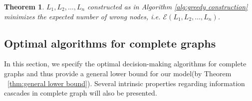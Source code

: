 \documentclass[a4paper,UKenglish]{lipics}
\newtheorem{thm}{Theorem}[section] %
\theoremstyle{definition}
\begin{document}
\begin{thm}
\label{local implies overall}
$L_1, L_2, \dots, L_n$ constructed as in Algorithm \ref{alg:greedy construction} minimizes the expected number of wrong nodes, 
	i.e. $\mathcal{E}(L_1, L_2, \dots, L_n)$.
\end{thm}



\subsection {Optimal algorithms for complete graphs}
In this section, we specify the optimal decision-making algorithms for complete graphs and thus provide a general lower bound for our model(by Theorem ~\ref{thm:general lower bound}).
Several intrinsic properties regarding information cascades in complete graph will also be presented.
\end{document}
